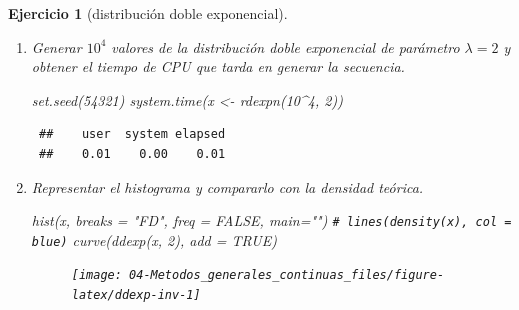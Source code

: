 \documentclass[
]{book}
\newenvironment{Shaded}{\begin{snugshade}}{\end{snugshade}}
\newcommand{\AttributeTok}[1]{\textcolor[rgb]{0.77,0.63,0.00}{#1}}
\newcommand{\CommentTok}[1]{\textcolor[rgb]{0.56,0.35,0.01}{\textit{#1}}}
\newcommand{\ConstantTok}[1]{\textcolor[rgb]{0.00,0.00,0.00}{#1}}
\newcommand{\ControlFlowTok}[1]{\textcolor[rgb]{0.13,0.29,0.53}{\textbf{#1}}}
\newcommand{\DecValTok}[1]{\textcolor[rgb]{0.00,0.00,0.81}{#1}}
\newcommand{\FunctionTok}[1]{\textcolor[rgb]{0.00,0.00,0.00}{#1}}
\newcommand{\NormalTok}[1]{#1}
\newcommand{\OtherTok}[1]{\textcolor[rgb]{0.56,0.35,0.01}{#1}}
\newcommand{\SpecialCharTok}[1]{\textcolor[rgb]{0.00,0.00,0.00}{#1}}
\newcommand{\StringTok}[1]{\textcolor[rgb]{0.31,0.60,0.02}{#1}}
\theoremstyle{break}
\newtheorem{exercise}{Ejercicio}[chapter]
\theoremstyle{nonumberplain}
\renewcommand{\CommentTok}[1]{\textcolor[rgb]{0.41,0.41,0.41}{\texttt{#1}}}
\begin{document}
\begin{exercise}[distribución doble exponencial]
\begin{enumerate}
\begin{Shaded}
\begin{Highlighting}[]
\NormalTok{rdexpn }\OtherTok{\textless{}{-}} \ControlFlowTok{function}\NormalTok{(}\AttributeTok{n =} \DecValTok{1000}\NormalTok{, }\AttributeTok{lambda =} \DecValTok{1}\NormalTok{) \{}
\CommentTok{\# Simulación n valores de doble exponencial}
\NormalTok{    x }\OtherTok{\textless{}{-}} \FunctionTok{numeric}\NormalTok{(n)}
    \ControlFlowTok{for}\NormalTok{(i }\ControlFlowTok{in} \DecValTok{1}\SpecialCharTok{:}\NormalTok{n) x[i]}\OtherTok{\textless{}{-}}\FunctionTok{rdexp}\NormalTok{(lambda)}
    \FunctionTok{return}\NormalTok{(x)}
\NormalTok{\}}
\end{Highlighting}
\end{Shaded}
\item
  Generar \(10^{4}\) valores de la distribución doble exponencial de
  parámetro \(\lambda=2\) y obtener el tiempo de CPU que tarda en
  generar la secuencia.

\begin{Shaded}
\begin{Highlighting}[]
\FunctionTok{set.seed}\NormalTok{(}\DecValTok{54321}\NormalTok{)}
\FunctionTok{system.time}\NormalTok{(x }\OtherTok{\textless{}{-}} \FunctionTok{rdexpn}\NormalTok{(}\DecValTok{10}\SpecialCharTok{\^{}}\DecValTok{4}\NormalTok{, }\DecValTok{2}\NormalTok{))}
\end{Highlighting}
\end{Shaded}

\begin{verbatim}
 ##    user  system elapsed 
 ##    0.01    0.00    0.01
\end{verbatim}
\item
  Representar el histograma y compararlo con la densidad teórica.

\begin{Shaded}
\begin{Highlighting}[]
\FunctionTok{hist}\NormalTok{(x, }\AttributeTok{breaks =} \StringTok{"FD"}\NormalTok{, }\AttributeTok{freq =} \ConstantTok{FALSE}\NormalTok{, }\AttributeTok{main=}\StringTok{""}\NormalTok{)}
\CommentTok{\# lines(density(x), col = \textquotesingle{}blue\textquotesingle{})}
\FunctionTok{curve}\NormalTok{(}\FunctionTok{ddexp}\NormalTok{(x, }\DecValTok{2}\NormalTok{), }\AttributeTok{add =} \ConstantTok{TRUE}\NormalTok{)}
\end{Highlighting}
\end{Shaded}

  \begin{figure}[!htb]

  {\centering \texttt{[image: 04-Metodos\_generales\_continuas\_files/figure-latex/ddexp-inv-1]} 

}
\end{figure}
\end{enumerate}
\end{exercise}
\end{document}
